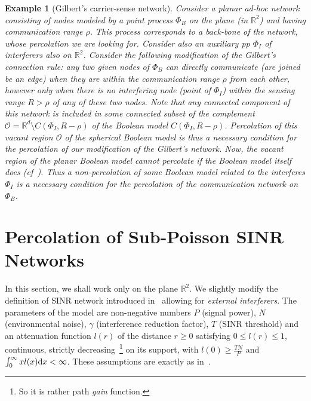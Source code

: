 \documentclass[conference]{IEEEtran}
\newtheorem{ex}[Th]{Example}
\begin{document}
\begin{ex}[Gilbert's carrier-sense network]
Consider a planar 
ad-hoc network consisting of nodes modeled by a point
process $\Phi_B$ on the plane (in ${{\mathbb{R}}}^2$) 
and  having communication range $\rho$.
This process corresponds to a {\em back-bone} of the  network,
whose percolation we are looking for.
Consider also an auxiliary pp $\Phi_I$ of {\em interferers}
also on ${{\mathbb{R}}}^2$. Consider the following modification of the Gilbert's
connection rule: any two given nodes of $\Phi_B$ can directly communicate
(are joined be an edge) when they are within the communication range
$\rho$ from each other,  
however only when there is no interfering node (point  of $\Phi_I$)
within the {\em  sensing range} $R>\rho$ of any of these two nodes.
Note that any connected component of this network is included in some
connected subset of the {\em complement} ${{\mathcal{O}}}={{\mathbb{R}}}^d\setminus C(\Phi_I,R-\rho)$
of the Boolean model $C(\Phi_I,R-\rho)$.  Percolation of
this {\em vacant region} ${{\mathcal{O}}}$ of the spherical Boolean model
is thus a necessary condition for the percolation of our  modification 
of the Gilbert's network. Now, the vacant region of the planar Boolean model 
cannot percolate if the Boolean model itself does (cf~\cite[Theorem
  4.4]{MR96}). Thus a non-percolation of some Boolean model 
related to the interferes $\Phi_I$ is a necessary condition for 
the percolation of the communication network on $\Phi_B$.
\end{ex}

\section{Percolation of Sub-Poisson SINR Networks}
\label{s.SINR}

In this section, we shall work only on the plane ${{\mathbb{R}}}^2$.
We slightly modify the definition of SINR network introduced
in~\cite{Dousse_etal_TON} allowing for {\em external interferers}.
The parameters of the model are non-negative numbers $P$ (signal
power),  $N$ (environmental noise), $\gamma$ (interference reduction
factor), $T$ (SINR threshold) and an attenuation 
function $l(r)$ of the distance $r\ge0$ satisfying
$0\le l(r)\leq 1$, continuous,  strictly decreasing~\footnote{So
  it is rather path {\em gain} function.}
 on its support, with 
$l(0) \geq \frac{TN}{P}$ and 
$\int_0^{\infty} x l(x) {\text{\rm d}} x  < \infty$.
These assumptions are exactly as in~\cite{Dousse_etal}.
\end{document}

